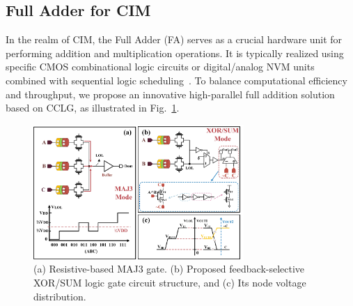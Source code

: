 \documentclass[submit]{elex2024}%
\begin{document}
\subsection{Full Adder for CIM}
In the realm of CIM, the Full Adder (FA) serves as a crucial hardware unit for performing addition and multiplication operations. It is typically realized using specific CMOS combinational logic circuits or digital/analog NVM units combined with sequential logic scheduling~\cite{13,16,28}. To balance computational efficiency and throughput, we propose an innovative high-parallel full addition solution based on CCLG, as illustrated in Fig.~\ref{fig:4}.
\begin{figure}[htb]
    \begin{center}
    \includegraphics[width=8cm]{Figures/fig4.pdf}
    \end{center}
    \caption{(a) Resistive-based MAJ3 gate. (b) Proposed feedback-selective XOR/SUM logic gate circuit structure, and (c) Its node voltage distribution.}
    \label{fig:4}
\end{figure}
\end{document}
